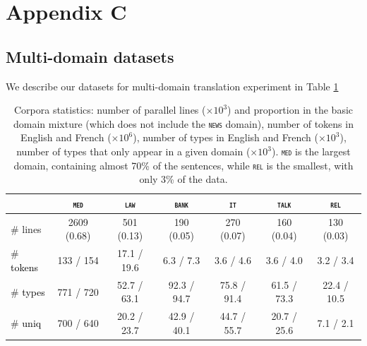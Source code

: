 \documentclass[11pt]{article}
\newcommand{\revisiondone}[1]{\textcolor{black}{#1}}
\newcommand{\domain}[1]{\texttt{\textsc{#1}}}
\begin{document}
\section{Appendix C}
\label{appendix:c}
\subsection{Multi-domain datasets}
We describe our datasets for multi-domain translation experiment in Table \ref{tab:Corpora-chap4}
\begin{table}
  \centering
  \begin{tabular}{|l|cccccc|} %
    \cline{2-7} 
    \multicolumn{1}{c|}{} & \multicolumn{1}{c}{\domain{med}} & \multicolumn{1}{c}{\domain{law}} & \multicolumn{1}{c}{\domain{bank}} & \multicolumn{1}{c}{\domain{it}} & \multicolumn{1}{c}{\domain{talk}} & \multicolumn{1}{c}{\domain{rel}} \\
    \hline 
    \# lines & 2609 (0.68) & 501 (0.13) & 190 (0.05) & 270 (0.07) & 160 (0.04) & 130 (0.03) \\
    \# \revisiondone{tokens}  &  133 / 154  &  17.1 / 19.6 &  6.3 / 7.3 &  3.6 / 4.6 &  3.6 / 4.0 &  3.2 / 3.4 \\
    \# \revisiondone{types}  & 771 / 720 & 52.7 / 63.1 & 92.3 / 94.7 & 75.8 / 91.4 & 61.5 / 73.3 & 22.4 / 10.5 \\
    \# \revisiondone{uniq} & 700 / 640 & 20.2 / 23.7 & 42.9 / 40.1 & 44.7 / 55.7 & 20.7 / 25.6 & 7.1 / 2.1 \\
    \hline
  \end{tabular}
  \caption{Corpora statistics: number of parallel lines ($\times 10^3$) and proportion in the basic domain mixture (which does not include the \domain{news} domain), number of tokens in English and French ($\times 10^6$), number of types in English and French ($\times 10^3$), number of types that only appear in a given domain ($\times 10^3$). \domain{med} is the largest domain, containing almost 70\% of the sentences, while \domain{rel} is the smallest, with only 3\% of the data.
  }
\label{tab:Corpora-chap4}
\end{table}
\end{document}
